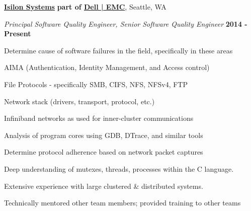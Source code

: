 \documentclass[10pt]{article}
\newcommand{\halfblankline}{\quad\vspace{-0.5\baselineskip}\pagebreak[3]}
\begin{document}
\href{https://www.emc.com/en-us/storage/isilon/}{\textbf{Isilon Systems}}\textbf{ part of \href{https://www.emc.com/en-us/}{Dell | EMC}}, Seattle, WA
\begin{outerlist}
  \item[] \textit{Principal Software Quality Engineer, Senior Software Quality Engineer}
  \hfill \textbf{2014 - Present}
  \begin{innerlist}
  \item Determine cause of software failures in the field, specifically in these areas
  \begin{innerlist}
    \item AIMA (Authentication, Identity Management, and Access control)
    \item File Protocols - specifically SMB, CIFS, NFS, NFSv4, FTP
    \item Network stack (drivers, transport, protocol, etc.)
    \item Infiniband networks as used for inner-cluster communications
  \end{innerlist}
  \item Analysis of program cores using GDB, DTrace, and similar tools
  \item Determine protocol adherence based on network packet captures
  \item Deep understanding of mutexes, threads, processes within the C language.
  \item Extensive experience with large clustered \& distributed systems.
  \item Technically mentored other team members; provided training to other teams
  \end{innerlist}
\end{outerlist}

\halfblankline
\end{document}
